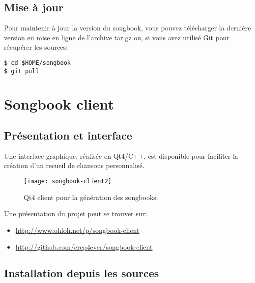 \documentclass[a4paper]{article}
\begin{document}
\subsection{Mise à jour}

Pour maintenir à jour la version du songbook, vous pouvez télécharger
la dernière version en mise en ligne de l'archive tar.gz ou, si vous
avez utilisé Git pour récupérer les sources:
\begin{verbatim}
$ cd $HOME/songbook
$ git pull
\end{verbatim} 

\section{Songbook client}

\subsection{Présentation et interface}

Une interface graphique, réalisée en Qt4/C++, est disponible pour
faciliter la création d'un recueil de chansons personnalisé.

\begin{figure}
  \centering
  \texttt{[image: songbook-client2]}
  \caption{Qt4 client pour la génération des songbooks.}
  \label{fig:sb-client}
\end{figure}

Une présentation du projet peut se trouver sur:
\begin{itemize}
\item \url{http://www.ohloh.net/p/songbook-client}
\item \url{http://github.com/crep4ever/songbook-client}
\end{itemize}

\subsection{Installation depuis les sources}
\end{document}
